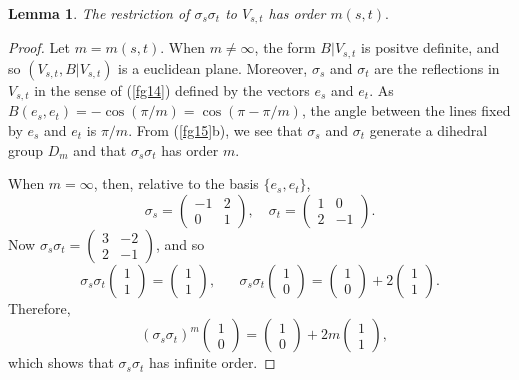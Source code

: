 \documentclass[a4paper,11pt,final,openany]{memoir}%
\newtheorem{lemma}[X]{Lemma}
\theoremstyle{nonumberplain}
\newtheorem{proof}{Proof.}
\begin{document}
\begin{lemma}
\label{fg18}The restriction of $\sigma_{s}\sigma_{t}$ to $V_{s,t}$ has order
$m(s,t).$
\end{lemma}

\begin{proof}
Let $m=m(s,t)$. When $m\neq\infty$, the form $B|V_{s,t}$ is positve definite,
and so $(V_{s,t},B|V_{s,t})$ is a euclidean plane. Moreover, $\sigma_{s}$ and
$\sigma_{t}$ are the reflections in $V_{s,t}$ in the sense of (\ref{fg14})
defined by the vectors $e_{s}$ and $e_{t}$. As $B(e_{s},e_{t})=-\cos
(\pi/m)=\cos(\pi-\pi/m)$, the angle between the lines fixed by $e_{s}$ and
$e_{t}$ is $\pi/m$. From (\ref{fg15}b), we see that $\sigma_{s}$ and
$\sigma_{t}$ generate a dihedral group $D_{m}$ and that $\sigma_{s}\sigma_{t}$
has order $m$.

When $m=\infty$, then, relative to the basis $\{e_{s},e_{t}\}$,
\[
\sigma_{s}=%
\begin{pmatrix}
-1 & 2\\
0 & 1
\end{pmatrix}
,\quad\sigma_{t}=%
\begin{pmatrix}
1 & 0\\
2 & -1
\end{pmatrix}
.
\]
Now $\sigma_{s}\sigma_{t}=%
\begin{pmatrix}
3 & -2\\
2 & -1
\end{pmatrix}
$, and so%
\[
\sigma_{s}\sigma_{t}%
\begin{pmatrix}
1\\
1
\end{pmatrix}
=%
\begin{pmatrix}
1\\
1
\end{pmatrix}
,\quad\text{ }\sigma_{s}\sigma_{t}%
\begin{pmatrix}
1\\
0
\end{pmatrix}
=%
\begin{pmatrix}
1\\
0
\end{pmatrix}
+2%
\begin{pmatrix}
1\\
1
\end{pmatrix}
\text{.}%
\]
Therefore,%
\[
\text{ }\left(  \sigma_{s}\sigma_{t}\right)  ^{m}%
\begin{pmatrix}
1\\
0
\end{pmatrix}
=%
\begin{pmatrix}
1\\
0
\end{pmatrix}
+2m%
\begin{pmatrix}
1\\
1
\end{pmatrix}
,
\]
which shows that $\sigma_{s}\sigma_{t}$ has infinite order.
\end{proof}
\end{document}
